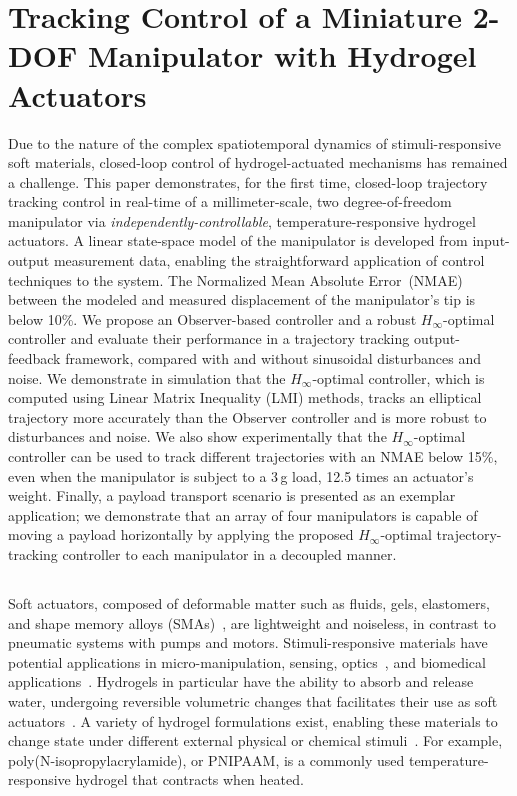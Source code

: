 \graphicspath{{Images/control/}}

\chapter{Tracking Control of a Miniature 2-DOF Manipulator with Hydrogel Actuators}
\label{chap:control}
Due to the nature of the complex spatiotemporal dynamics of stimuli-responsive soft materials, closed-loop control of hydrogel-actuated mechanisms has remained a challenge. This paper demonstrates, for the first time, closed-loop trajectory tracking control in real-time of a millimeter-scale, two degree-of-freedom manipulator via \emph{independently-controllable}, temperature-responsive hydrogel actuators. A linear state-space model of the manipulator is developed from input-output measurement data, enabling the straightforward application of control techniques to the system. The Normalized Mean Absolute Error~(NMAE) between the modeled and measured displacement of the manipulator's tip is below 10\%. We propose an Observer-based controller and a robust $H_{\infty}$-optimal controller and evaluate their 
performance in a trajectory tracking output-feedback framework, compared with and without sinusoidal disturbances and noise. We demonstrate in simulation that the $H_\infty$-optimal controller, which is computed using Linear Matrix Inequality (LMI) methods, tracks an elliptical trajectory more accurately than the Observer controller and is more robust to disturbances and noise. We also show experimentally that the $H_\infty$-optimal controller can be used to track different trajectories with an NMAE below 15$\%$, even when the manipulator is subject to a 3\,g load, 12.5 times an actuator's weight. Finally, a payload transport scenario is presented as an exemplar application; we demonstrate that an array of four manipulators is capable of moving a payload horizontally by applying the proposed $H_\infty$-optimal trajectory-tracking controller to each manipulator in a decoupled manner.
\section{}
Soft actuators, composed of deformable matter such as fluids, gels, elastomers, and shape memory alloys (SMAs)~\cite{Majidi2014}, are lightweight and noiseless, in contrast to pneumatic systems with pumps and motors. Stimuli-responsive materials have potential applications in micro-manipulation, sensing, optics~\cite{Mantha2019,Qin2019}, and biomedical applications~\cite{Guiseppi-Elie2010}. Hydrogels in particular have the ability to absorb and release water, undergoing reversible volumetric changes that facilitates their use as soft actuators~\cite{Mishra2020}. A variety of hydrogel formulations exist, enabling these materials to change state under different external physical or chemical stimuli~\cite{Peng2018,He2012}. For example, poly(N-isopropylacrylamide), or PNIPAAM, is a commonly used temperature-responsive hydrogel that contracts when heated.


